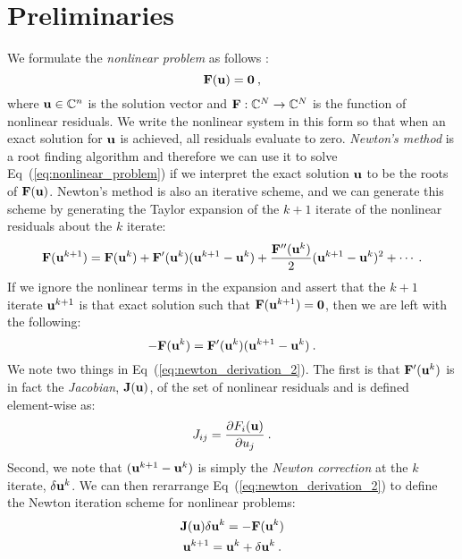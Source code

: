 \section{Preliminaries}
\label{sec:nonlinear_preliminaries}
We formulate the \textit{nonlinear problem} as follows
\citep{knoll_jacobian-free_2004}:
\begin{equation}
  \mathbf{F}(\mathbf{u}) = \mathbf{0}\:,
  \label{eq:nonlinear_problem}
\end{equation}
where $\mathbf{u} \in \mathbb{C}^n$ is the solution vector and
$\mathbf{F}:\mathbb{C}^N \rightarrow \mathbb{C}^N$ is the function of
nonlinear residuals. We write the nonlinear system in this form so
that when an exact solution for $\mathbf{u}$ is achieved, all residuals
evaluate to zero. \textit{Newton's method} is a root finding algorithm
and therefore we can use it to solve Eq~(\ref{eq:nonlinear_problem})
if we interpret the exact solution $\mathbf{u}$ to be the roots of
$\mathbf{F}(\mathbf{u})$. Newton's method is also an iterative scheme, and we
can generate this scheme by generating the Taylor expansion of the
$k+1$ iterate of the nonlinear residuals about the $k$ iterate:
\begin{equation}
  \mathbf{F}(\mathbf{u}^{k+1}) = \mathbf{F}(\mathbf{u}^{k}) +
  \mathbf{F}'(\mathbf{u}^{k})(\mathbf{u}^{k+1}-\mathbf{u}^{k}) +
  \frac{\mathbf{F}''(\mathbf{u}^{k})}{2}(\mathbf{u}^{k+1}-\mathbf{u}^{k})^2 + \cdots
  \:.
  \label{eq:newton_derivation_1}
\end{equation}
If we ignore the nonlinear terms in the expansion and assert that the
$k+1$ iterate $\mathbf{u}^{k+1}$ is that exact solution such that
$\mathbf{F}(\mathbf{u}^{k+1}) = \mathbf{0}$, then we are left with the following:
\begin{equation}
  -\mathbf{F}(\mathbf{u}^{k}) =
  \mathbf{F}'(\mathbf{u}^{k})(\mathbf{u}^{k+1}-\mathbf{u}^{k})\:.
  \label{eq:newton_derivation_2}
\end{equation}
We note two things in Eq~(\ref{eq:newton_derivation_2}). The first is
that $\mathbf{F}'(\mathbf{u}^{k})$ is in fact the \textit{Jacobian},
$\mathbf{J}(\mathbf{u})$, of the set of nonlinear residuals and is defined
element-wise as:
\begin{equation}
  J_{ij} = \frac{\partial F_i(\mathbf{u})}{\partial u_j}\:.
  \label{eq:jacobian_def}
\end{equation}
Second, we note that $(\mathbf{u}^{k+1}-\mathbf{u}^{k})$ is simply the
\textit{Newton correction} at the $k$ iterate, $\delta \mathbf{u}^k$. We
can then rerarrange Eq~(\ref{eq:newton_derivation_2}) to define the
Newton iteration scheme for nonlinear problems:
\begin{subequations}
  \begin{gather}
    \mathbf{J}(\mathbf{u}) \delta \mathbf{u}^k = -\mathbf{F}(\mathbf{u}^{k})\\
    \mathbf{u}^{k+1} = \mathbf{u}^k + \delta \mathbf{u}^k\:.
  \end{gather}
  \label{eq:newton_iteration}
\end{subequations}
